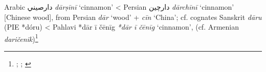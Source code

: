 \begin{etymology}\label{ety:darsini}
Arabic {دارصيني} \textit{dārṣīnī} `cinnamon'
< Persian {دارچین} \textit{dārchīnī} `cinnamon' [Chinese wood], from Persian \textit{dār} `wood' + \textit{cīn} `China'; cf. cognates Sanskrit \textit{dāru} (PIE *dóru)
< Pahlavi {*dār ī čēnīg} \textit{*dār ī čēnīg} `cinnamon', (cf. Armenian \textit{daričenik})\footnote{\textcite[311]{wehr_dictionary_1976}; \textcite{dietrich_dar_2004}; \textcite{alam_darcini_2011}}
\end{etymology}